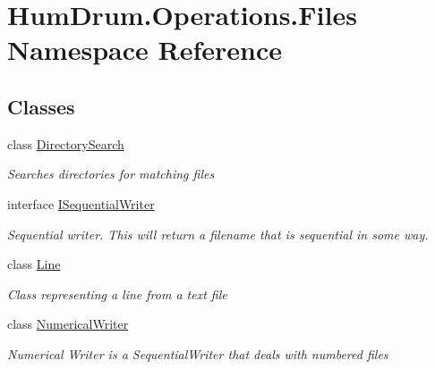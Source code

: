 \hypertarget{namespaceHumDrum_1_1Operations_1_1Files}{}\section{Hum\+Drum.\+Operations.\+Files Namespace Reference}
\label{namespaceHumDrum_1_1Operations_1_1Files}
\subsection*{Classes}
\begin{DoxyCompactItemize}
\item 
class \hyperlink{classHumDrum_1_1Operations_1_1Files_1_1DirectorySearch}{Directory\+Search}
\begin{DoxyCompactList}\small\item\em Searches directories for matching files \end{DoxyCompactList}\item 
interface \hyperlink{interfaceHumDrum_1_1Operations_1_1Files_1_1ISequentialWriter}{I\+Sequential\+Writer}
\begin{DoxyCompactList}\small\item\em Sequential writer. This will return a filename that is sequential in some way. \end{DoxyCompactList}\item 
class \hyperlink{classHumDrum_1_1Operations_1_1Files_1_1Line}{Line}
\begin{DoxyCompactList}\small\item\em Class representing a line from a text file \end{DoxyCompactList}\item 
class \hyperlink{classHumDrum_1_1Operations_1_1Files_1_1NumericalWriter}{Numerical\+Writer}
\begin{DoxyCompactList}\small\item\em Numerical Writer is a Sequential\+Writer that deals with numbered files \end{DoxyCompactList}\end{DoxyCompactItemize}

